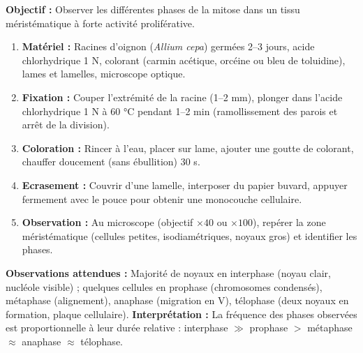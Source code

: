 \documentclass[11pt]{article}
\begin{document}
\begin{experience}
\textbf{Objectif :} Observer les différentes phases de la mitose dans un tissu méristématique à forte activité proliférative.
\begin{methode}
\begin{enumerate}
\item \textbf{Matériel :} Racines d'oignon (\emph{Allium cepa}) germées 2--3 jours, acide chlorhydrique 1 N, colorant (carmin acétique, orcéine ou bleu de toluidine), lames et lamelles, microscope optique.
\item \textbf{Fixation :} Couper l'extrémité de la racine (1--2 mm), plonger dans l'acide chlorhydrique 1 N à 60 °C pendant 1--2 min (ramollissement des parois et arrêt de la division).
\item \textbf{Coloration :} Rincer à l'eau, placer sur lame, ajouter une goutte de colorant, chauffer doucement (sans ébullition) 30 s.
\item \textbf{Ecrasement :} Couvrir d'une lamelle, interposer du papier buvard, appuyer fermement avec le pouce pour obtenir une monocouche cellulaire.
\item \textbf{Observation :} Au microscope (objectif $\times 40$ ou $\times 100$), repérer la zone méristématique (cellules petites, isodiamétriques, noyaux gros) et identifier les phases.
\end{enumerate}
\textbf{Observations attendues :} Majorité de noyaux en interphase (noyau clair, nucléole visible) ; quelques cellules en prophase (chromosomes condensés), métaphase (alignement), anaphase (migration en V), télophase (deux noyaux en formation, plaque cellulaire).
\textbf{Interprétation :} La fréquence des phases observées est proportionnelle à leur durée relative : interphase $\gg$ prophase $>$ métaphase $\approx$ anaphase $\approx$ télophase.
\end{methode}
\end{experience}
\end{document}
